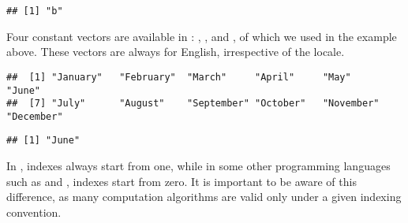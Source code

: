\documentclass[krantz2]{krantz}\usepackage{knitr}
\begin{document}
\begin{knitrout}\footnotesize
{}\color{fgcolor}\begin{kframe}
\begin{alltt}
\hlstd{a[}\hlstd{]}
\end{alltt}
\begin{verbatim}
## [1] "b"
\end{verbatim}
\end{kframe}
\end{knitrout}

\begin{explainbox}
Four constant vectors are available in \Rlang: , ,  and  , of which we used  in the example above. These vectors are always for English, irrespective of the locale.

\begin{knitrout}\footnotesize
{}\color{fgcolor}\begin{kframe}
\begin{alltt}
\end{alltt}
\begin{verbatim}
##  [1] "January"   "February"  "March"     "April"     "May"       "June"     
##  [7] "July"      "August"    "September" "October"   "November"  "December"
\end{verbatim}
\begin{alltt}
\hlstd{month.name[}\hlstd{]}
\end{alltt}
\begin{verbatim}
## [1] "June"
\end{verbatim}
\end{kframe}
\end{knitrout}
\end{explainbox}

\begin{warningbox}
In \Rlang, indexes always start from one, while in some other programming languages such as \Clang and \Cpplang, indexes start from zero. It is important to be aware of this difference, as many computation algorithms are valid only under a given indexing convention.
\end{warningbox}
\end{document}
